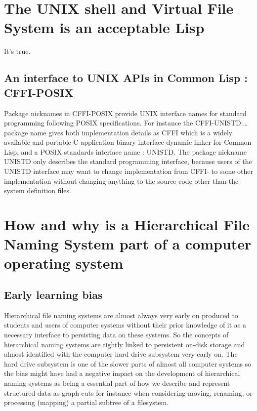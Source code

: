\documentclass[sigconf]{acmart}
\begin{document}




\maketitle


\section{The UNIX shell and Virtual File System is an acceptable Lisp}

It's true.

\subsection{An interface to UNIX APIs in Common Lisp : CFFI-POSIX}

Package nicknames in CFFI-POSIX provide UNIX interface names for
standard programming following POSIX specifications. For instance the
CFFI-UNISTD:\ldots package name gives both implementation details as
CFFI which is a widely available and portable C application binary
interface dynamic linker for Common Lisp, and a POSIX standards
interface name : UNISTD. The package nickname UNISTD only describes
the standard programming interface, because users of the UNISTD
interface may want to change implementation from CFFI- to some other
implementation without changing anything to the source code other than
the system definition files.


\section{How and why is a Hierarchical File Naming System part of a computer operating system}

\subsection{Early learning bias}
Hierarchical file naming systems are almost always very early on produced to students and users of computer systems without their prior knowledge of it as a necessary interface to persisting data on these systems. So the concepts of hierarchical naming systems are tightly linked to persistent on-disk storage and almost identified with the computer hard drive subsystem very early on. The hard drive subsystem is one of the slower parts of almost all computer systems so the bias might have had a negative impact on the development of hierarchical naming systems as being a essential part of how we describe and represent structured data as graph cuts for instance when considering moving, renaming, or processing (mapping) a partial subtree of a filesystem.
\end{document}
